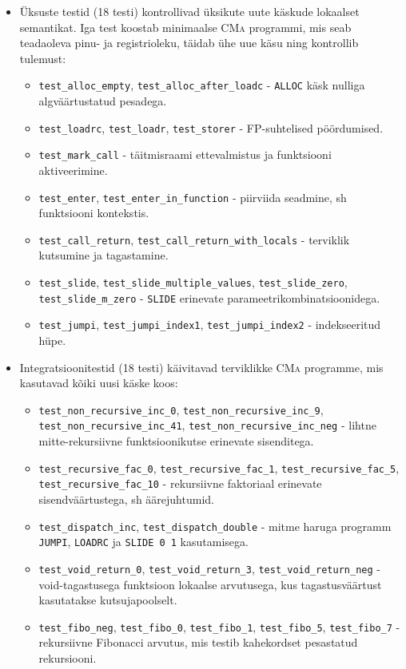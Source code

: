 \begin{itemize}
	\item {Üksuste testid (18 testi)} kontrollivad üksikute uute käskude lokaalset semantikat. Iga test koostab minimaalse \textsc{CMa} programmi, mis seab teadaoleva pinu- ja registrioleku, täidab ühe uue käsu ning kontrollib tulemust:
	\begin{itemize}
		\item \texttt{test\_alloc\_empty}, \texttt{test\_alloc\_after\_loadc} - \texttt{ALLOC} käsk nulliga algväärtustatud pesadega.
		\item \texttt{test\_loadrc}, \texttt{test\_loadr}, \texttt{test\_storer} - FP-suhtelised pöördumised.
		\item \texttt{test\_mark\_call} - täitmisraami ettevalmistus ja funktsiooni aktiveerimine.
		\item \texttt{test\_enter}, \texttt{test\_enter\_in\_function} - piirviida seadmine, sh funktsiooni kontekstis.
		\item \texttt{test\_call\_return}, \texttt{test\_call\_return\_with\_locals} - terviklik kutsumine ja tagastamine.
		\item \texttt{test\_slide}, \texttt{test\_slide\_multiple\_values}, \texttt{test\_slide\_zero}, \texttt{test\_slide\_m\_zero} - \texttt{SLIDE} erinevate parameetrikombinatsioonidega.
		\item \texttt{test\_jumpi}, \texttt{test\_jumpi\_index1}, \texttt{test\_jumpi\_index2} - indekseeritud hüpe.
	\end{itemize}

	\item {Integratsioonitestid (18 testi)} käivitavad terviklikke \textsc{CMa} programme, mis kasutavad kõiki uusi käske koos:
	\begin{itemize}
		\item \texttt{test\_non\_recursive\_inc\_0}, \texttt{test\_non\_recursive\_inc\_9}, \texttt{test\_non\_recursive\_inc\_41}, \texttt{test\_non\_recursive\_inc\_neg} - lihtne mitte-rekursiivne funktsioonikutse erinevate sisenditega.
		\item \texttt{test\_recursive\_fac\_0}, \texttt{test\_recursive\_fac\_1}, \texttt{test\_recursive\_fac\_5}, \texttt{test\_recursive\_fac\_10} - rekursiivne faktoriaal erinevate sisendväärtustega, sh äärejuhtumid.
		\item \texttt{test\_dispatch\_inc}, \texttt{test\_dispatch\_double} - mitme haruga programm \texttt{JUMPI}, \texttt{LOADRC} ja \texttt{SLIDE 0 1} kasutamisega.
		\item \texttt{test\_void\_return\_0}, \texttt{test\_void\_return\_3}, \texttt{test\_void\_return\_neg} - void-tagastusega funktsioon lokaalse arvutusega, kus tagastusväärtust kasutatakse kutsujapoolselt.
		\item \texttt{test\_fibo\_neg}, \texttt{test\_fibo\_0}, \texttt{test\_fibo\_1}, \texttt{test\_fibo\_5}, \texttt{test\_fibo\_7} - rekursiivne Fibonacci arvutus, mis testib kahekordset pesastatud rekursiooni.
	\end{itemize}


\end{itemize}
